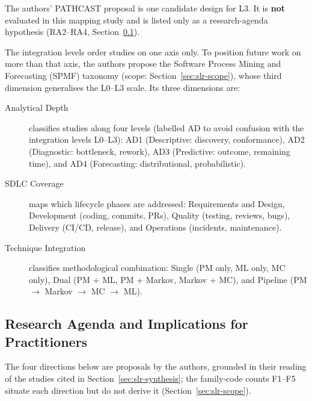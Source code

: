 The authors' PATHCAST proposal is one candidate design for L3. It is
\textbf{not} evaluated in this mapping study and is listed only as a
research-agenda hypothesis (RA2--RA4, Section~\ref{sec:slr-agenda}).

\label{sec:slr-taxonomy}%
The integration levels order studies on one axis only. To position future
work on more than that axis, the authors propose the Software Process
Mining and Forecasting (SPMF) taxonomy (scope: Section~\ref{sec:slr-scope}),
whose third dimension generalises the L0--L3 scale. Its three dimensions
are:

\begin{description}
\item[Analytical Depth] classifies studies along four levels (labelled AD
  to avoid confusion with the integration levels L0--L3): AD1
  (Descriptive: discovery, conformance), AD2 (Diagnostic: bottleneck, rework),
  AD3 (Predictive: outcome, remaining time), and AD4 (Forecasting:
  distributional, probabilistic).

\item[SDLC Coverage] maps which lifecycle phases are addressed: Requirements
  and Design, Development (coding, commits, PRs), Quality (testing, reviews,
  bugs), Delivery (CI/CD, release), and Operations (incidents, maintenance).

\item[Technique Integration] classifies methodological combination:
  Single (PM only, ML only, MC only), Dual (PM + ML, PM + Markov, Markov + MC),
  and Pipeline (PM $\rightarrow$ Markov $\rightarrow$ MC $\rightarrow$ ML).
\end{description}


\subsection{Research Agenda and Implications for Practitioners}
\label{sec:slr-agenda}

The four directions below are proposals by the authors, grounded in their
reading of the studies cited in Section~\ref{sec:slr-synthesis}; the
family-code counts F1--F5 situate each direction but do not derive it
(Section~\ref{sec:slr-scope}).

